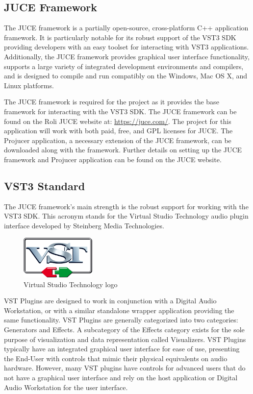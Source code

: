 \documentclass[a4paper,12pt]{report}
\begin{document}
\subsection{JUCE Framework}
\label{subsec:juceframework}
The JUCE framework is a partially open-source, cross-platform C++ application framework. It is particularly notable for its robust support of the VST3 SDK providing developers with an easy toolset for interacting with VST3 applications. Additionally, the JUCE framework provides graphical user interface functionality, supports a large variety of integrated development environments and compilers, and is designed to compile and run compatibly on the Windows, Mac OS X, and Linux platforms.

The JUCE framework is required for the project as it provides the base framework for interacting with the VST3 SDK. The JUCE framework can be found on the Roli JUCE website at: \href{https://juce.com/}{https://juce.com/}. The project for this application will work with both paid, free, and GPL licenses for JUCE. The Projucer application, a necessary extension of the JUCE framework, can be downloaded along with the framework. Further details on setting up the JUCE framework and Projucer application can be found on the JUCE website.

\subsection{VST3 Standard}
\label{subsec:vst3standard}
The JUCE framework's main strength is the robust support for working with the VST3 SDK. This acronym stands for the Virtual Studio Technology audio plugin interface developed by Steinberg Media Technologies. 

\begin{figure} \centering
\includegraphics[width=10em]{VST3Logo.png}
    \caption{Virtual Studio Technology logo}     \label{fig:VST3Logo} \end{figure}

VST Plugins are designed to work in conjunction with a Digital Audio Workstation, or with a similar standalone wrapper application providing the same functionality. VST Plugins are generally categorized into two categories: Generators and Effects. A subcategory of the Effects category exists for the sole purpose of visualization and data representation called Visualizers. VST Plugins typically have an integrated graphical user interface for ease of use, presenting the End-User with controls that mimic their physical equivalents on audio hardware. However, many VST plugins have controls for advanced users that do not have a graphical user interface and rely on the host application or Digital Audio Workstation for the user interface.
\end{document}

